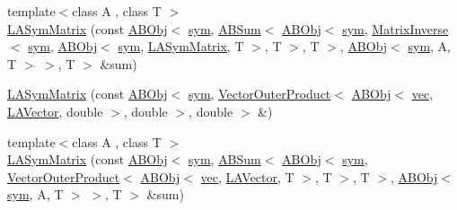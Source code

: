 \begin{DoxyCompactItemize}
\item 
{\footnotesize template$<$class A , class T $>$ }\\\mbox{\hyperlink{classROOT_1_1Minuit2_1_1LASymMatrix_a50ecd9916b1ca8941c767d16dbdb9b65}{L\+A\+Sym\+Matrix}} (const \mbox{\hyperlink{classROOT_1_1Minuit2_1_1ABObj}{A\+B\+Obj}}$<$ \mbox{\hyperlink{classROOT_1_1Minuit2_1_1sym}{sym}}, \mbox{\hyperlink{classROOT_1_1Minuit2_1_1ABSum}{A\+B\+Sum}}$<$ \mbox{\hyperlink{classROOT_1_1Minuit2_1_1ABObj}{A\+B\+Obj}}$<$ \mbox{\hyperlink{classROOT_1_1Minuit2_1_1sym}{sym}}, \mbox{\hyperlink{classROOT_1_1Minuit2_1_1MatrixInverse}{Matrix\+Inverse}}$<$ \mbox{\hyperlink{classROOT_1_1Minuit2_1_1sym}{sym}}, \mbox{\hyperlink{classROOT_1_1Minuit2_1_1ABObj}{A\+B\+Obj}}$<$ \mbox{\hyperlink{classROOT_1_1Minuit2_1_1sym}{sym}}, \mbox{\hyperlink{classROOT_1_1Minuit2_1_1LASymMatrix}{L\+A\+Sym\+Matrix}}, T $>$, T $>$, T $>$, \mbox{\hyperlink{classROOT_1_1Minuit2_1_1ABObj}{A\+B\+Obj}}$<$ \mbox{\hyperlink{classROOT_1_1Minuit2_1_1sym}{sym}}, A, T $>$ $>$, T $>$ \&sum)
\item 
\mbox{\hyperlink{classROOT_1_1Minuit2_1_1LASymMatrix_ab3813da18be7a37100a8f9c7cd49caf3}{L\+A\+Sym\+Matrix}} (const \mbox{\hyperlink{classROOT_1_1Minuit2_1_1ABObj}{A\+B\+Obj}}$<$ \mbox{\hyperlink{classROOT_1_1Minuit2_1_1sym}{sym}}, \mbox{\hyperlink{classROOT_1_1Minuit2_1_1VectorOuterProduct}{Vector\+Outer\+Product}}$<$ \mbox{\hyperlink{classROOT_1_1Minuit2_1_1ABObj}{A\+B\+Obj}}$<$ \mbox{\hyperlink{classROOT_1_1Minuit2_1_1vec}{vec}}, \mbox{\hyperlink{classROOT_1_1Minuit2_1_1LAVector}{L\+A\+Vector}}, double $>$, double $>$, double $>$ \&)
\item 
{\footnotesize template$<$class A , class T $>$ }\\\mbox{\hyperlink{classROOT_1_1Minuit2_1_1LASymMatrix_aed0e1071ce94c05d4b18e7594db9a249}{L\+A\+Sym\+Matrix}} (const \mbox{\hyperlink{classROOT_1_1Minuit2_1_1ABObj}{A\+B\+Obj}}$<$ \mbox{\hyperlink{classROOT_1_1Minuit2_1_1sym}{sym}}, \mbox{\hyperlink{classROOT_1_1Minuit2_1_1ABSum}{A\+B\+Sum}}$<$ \mbox{\hyperlink{classROOT_1_1Minuit2_1_1ABObj}{A\+B\+Obj}}$<$ \mbox{\hyperlink{classROOT_1_1Minuit2_1_1sym}{sym}}, \mbox{\hyperlink{classROOT_1_1Minuit2_1_1VectorOuterProduct}{Vector\+Outer\+Product}}$<$ \mbox{\hyperlink{classROOT_1_1Minuit2_1_1ABObj}{A\+B\+Obj}}$<$ \mbox{\hyperlink{classROOT_1_1Minuit2_1_1vec}{vec}}, \mbox{\hyperlink{classROOT_1_1Minuit2_1_1LAVector}{L\+A\+Vector}}, T $>$, T $>$, T $>$, \mbox{\hyperlink{classROOT_1_1Minuit2_1_1ABObj}{A\+B\+Obj}}$<$ \mbox{\hyperlink{classROOT_1_1Minuit2_1_1sym}{sym}}, A, T $>$ $>$, T $>$ \&sum)

\end{DoxyCompactItemize}
